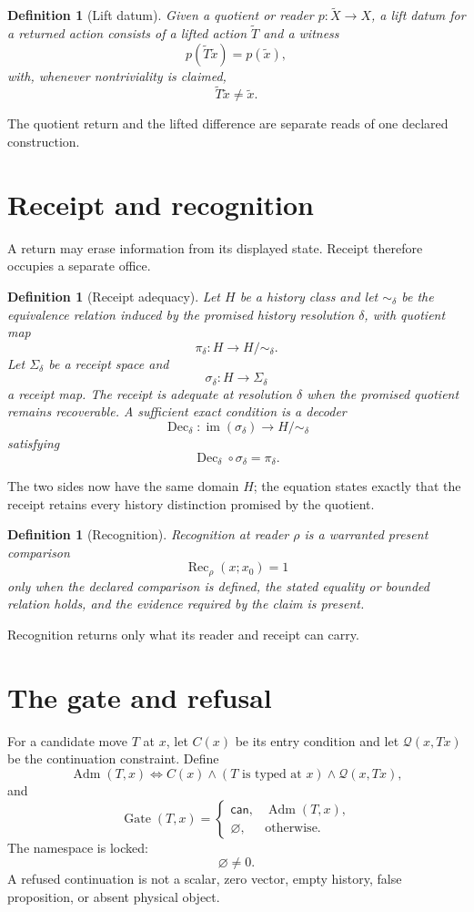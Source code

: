 \documentclass[11pt]{article}
\newtheorem{definition}[proposition]{Definition}
\begin{document}
\begin{definition}[Lift datum]
Given a quotient or reader \(p:\widetilde X\to X\), a lift datum for a returned action consists of a lifted action \(\widetilde T\) and a witness
\[
p(\widetilde T\widetilde x)=p(\widetilde x),
\]
with, whenever nontriviality is claimed,
\[
\widetilde T\widetilde x\neq\widetilde x.
\]
\end{definition}
The quotient return and the lifted difference are separate reads of one declared construction.

\section{Receipt and recognition}
A return may erase information from its displayed state. Receipt therefore occupies a separate office.

\begin{definition}[Receipt adequacy]\label{def:receipt}
Let \(H\) be a history class and let \(\sim_\delta\) be the equivalence relation induced by the promised history resolution \(\delta\), with quotient map
\[
\pi_\delta:H\to H/{\sim_\delta}.
\]
Let \(\Sigma_\delta\) be a receipt space and
\[
\sigma_\delta:H\to\Sigma_\delta
\]
a receipt map. The receipt is adequate at resolution \(\delta\) when the promised quotient remains recoverable. A sufficient exact condition is a decoder
\[
\operatorname{Dec}_\delta:\operatorname{im}(\sigma_\delta)\to H/{\sim_\delta}
\]
satisfying
\[
\boxed{\operatorname{Dec}_\delta\circ\sigma_\delta=\pi_\delta.}
\]
\end{definition}
The two sides now have the same domain \(H\); the equation states exactly that the receipt retains every history distinction promised by the quotient.

\begin{definition}[Recognition]
Recognition at reader \(\rho\) is a warranted present comparison
\[
\operatorname{Rec}_\rho(x;x_0)=1
\]
only when the declared comparison is defined, the stated equality or bounded relation holds, and the evidence required by the claim is present.
\end{definition}
Recognition returns only what its reader and receipt can carry.

\section{The gate and refusal}
For a candidate move \(T\) at \(x\), let \(C(x)\) be its entry condition and let \(\mathcal Q(x,Tx)\) be the continuation constraint. Define
\[
\operatorname{Adm}(T,x)
\iff
C(x)\wedge (T\text{ is typed at }x)\wedge\mathcal Q(x,Tx),
\]
and
\[
\operatorname{Gate}(T,x)=
\begin{cases}
\mathsf{can},&\operatorname{Adm}(T,x),\\
\varnothing,&\text{otherwise}.
\end{cases}
\]
The namespace is locked:
\[
\boxed{\varnothing\neq0.}
\]
A refused continuation is not a scalar, zero vector, empty history, false proposition, or absent physical object.
\end{document}
